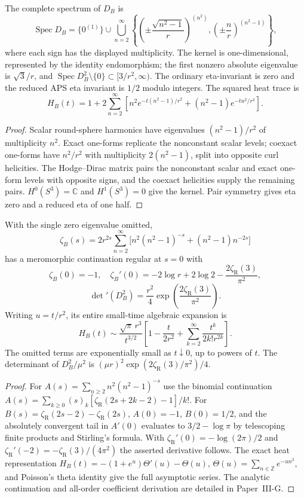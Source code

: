 \documentclass[12pt,a4paper]{article}
\begin{document}
\begin{corollary}
\label{p3b:cor:v349-meron-dirac-spectrum}
The complete spectrum of $D_B$ is
\[
 \operatorname{Spec}D_B=\{0^{(1)}\}
 \cup\bigcup_{n=2}^{\infty}
 \left\{\left(\pm\frac{\sqrt{n^2-1}}r\right)^{(n^2)},
 \left(\pm\frac nr\right)^{(n^2-1)}\right\},
\]
where each sign has the displayed multiplicity.  The kernel is
one-dimensional, represented by the identity endomorphism;
the first nonzero absolute eigenvalue is $\sqrt3/r$, and
$\operatorname{Spec}D_B^2\setminus\{0\}\subset[3/r^2,\infty)$.
The ordinary eta-invariant is zero and the reduced APS eta
invariant is $1/2$ modulo integers.  The squared heat trace is
\[
 H_B(t)=1+2\sum_{n=2}^\infty
 \left[n^2e^{-t(n^2-1)/r^2}
 +(n^2-1)e^{-tn^2/r^2}\right].
\]
\end{corollary}
\begin{proof}
Scalar round-sphere harmonics have eigenvalues
$(n^2-1)/r^2$ of multiplicity $n^2$.  Exact one-forms
replicate the nonconstant scalar levels; coexact one-forms
have $n^2/r^2$ with multiplicity $2(n^2-1)$, split into
opposite curl helicities.  The Hodge--Dirac matrix pairs the
nonconstant scalar and exact one-form levels with opposite
signs, and the coexact helicities supply the remaining pairs.
$H^0(S^3)=\mathbb C$ and $H^1(S^3)=0$ give the kernel.
Pair symmetry gives eta zero and a reduced eta of one half.
\end{proof}

\begin{theorem}
\label{p3b:thm:v349-meron-zeta-heat}
With the single zero eigenvalue omitted,
\[
 \zeta_B(s)=2r^{2s}\sum_{n=2}^\infty
 \bigl[n^2(n^2-1)^{-s}+(n^2-1)n^{-2s}\bigr]
\]
has a meromorphic continuation regular at $s=0$ with
\[
 \boxed{\zeta_B(0)=-1,\quad
 \zeta_B'(0)=-2\log r+2\log2
 -\frac{2\zeta_{\mathrm R}(3)}{\pi^2}},
\]
\[
 \boxed{\det{}'(D_B^2)=\frac{r^2}{4}
 \exp\left(\frac{2\zeta_{\mathrm R}(3)}{\pi^2}\right)}.
\]
Writing $u=t/r^2$, its entire small-time algebraic expansion is
\[
 H_B(t)\sim\frac{\sqrt\pi\,r^3}{t^{3/2}}
 \left[1-\frac{t}{2r^2}
 +\sum_{k=2}^\infty\frac{t^k}{2k!r^{2k}}\right].
\]
The omitted terms are exponentially small as $t\downarrow0$,
up to powers of $t$.  The determinant of $D_B^2/\mu^2$ is
$(\mu r)^2\exp(2\zeta_{\mathrm R}(3)/\pi^2)/4$.
\end{theorem}
\begin{proof}
For $A(s)=\sum_{n\ge2}n^2(n^2-1)^{-s}$ use the binomial
continuation
$A(s)=\sum_{k\ge0}(s)_k[\zeta_{\mathrm R}(2s+2k-2)-1]/k!$.
For $B(s)=\zeta_{\mathrm R}(2s-2)-\zeta_{\mathrm R}(2s)$,
$A(0)=-1$, $B(0)=1/2$, and the absolutely convergent tail
in $A'(0)$ evaluates to $3/2-\log\pi$ by telescoping
finite products and Stirling's formula.  With
$\zeta_{\mathrm R}'(0)=-\log(2\pi)/2$ and
$\zeta_{\mathrm R}'(-2)=-\zeta_{\mathrm R}(3)/(4\pi^2)$
the asserted derivative follows.
The exact heat representation
$H_B(t)=-(1+e^u)\Theta'(u)-\Theta(u)$,
$\Theta(u)=\sum_{n\in\mathbb Z}e^{-un^2}$,
and Poisson's theta identity give the full asymptotic series.
The analytic continuation and all-order coefficient derivation
are detailed in Paper~III-G.
\end{proof}
\end{document}
